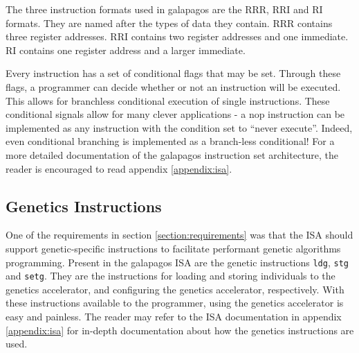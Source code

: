 The three instruction formats used in \Gls{galapagos} are the RRR, RRI and RI formats.
They are named after the types of data they contain.
RRR contains three register addresses.
RRI contains two register addresses and one immediate.
RI contains one register address and a larger immediate.

Every instruction has a set of conditional flags that may be set.
Through these flags, a programmer can decide whether or not an instruction will be executed.
This allows for branchless conditional execution of single instructions.
These conditional signals allow for many clever applications - a \gls{nop} instruction can be implemented as any instruction with the condition set to ``never execute''.
Indeed, even conditional branching is implemented as a branch-less conditional!
For a more detailed documentation of the \gls{galapagos} instruction set architecture, the reader is encouraged to read appendix \vref{appendix:isa}.


\subsection{Genetics Instructions}

One of the requirements in section \vref{section:requirements} was that the ISA should support genetic-specific instructions to facilitate performant genetic algorithms programming.
Present in the \Gls{galapagos} ISA are the genetic instructions \texttt{ldg}, \texttt{stg} and \texttt{setg}.
They are the instructions for loading and storing \glspl{individual} to the genetics accelerator, and configuring the genetics accelerator, respectively.
With these instructions available to the programmer, using the genetics accelerator is easy and painless.
The reader may refer to the ISA documentation in appendix \vref{appendix:isa} for in-depth documentation about how the genetics instructions are used.

